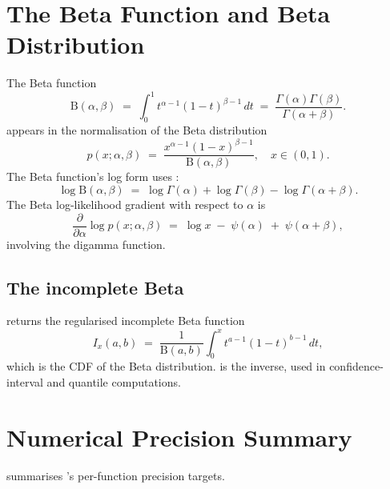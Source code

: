\section{The Beta Function and Beta Distribution}
\label{sec:special_functions:beta_function}

The Beta function
\[
\mathrm{B}(\alpha, \beta) \;=\; \int_0^1 t^{\alpha - 1} (1 - t)^{\beta - 1}\, dt
\;=\; \frac{\Gamma(\alpha) \Gamma(\beta)}{\Gamma(\alpha + \beta)}.
\]
appears in the normalisation of the Beta distribution
\[
p(x; \alpha, \beta) \;=\; \frac{x^{\alpha - 1} (1 - x)^{\beta - 1}}{\mathrm{B}(\alpha, \beta)},
\quad x \in (0, 1).
\]
The Beta function's log form uses :
\[
\log \mathrm{B}(\alpha, \beta) \;=\; \log\Gamma(\alpha) + \log\Gamma(\beta) - \log\Gamma(\alpha + \beta).
\]
The Beta log-likelihood gradient with respect to $\alpha$ is
\[
\frac{\partial}{\partial \alpha} \log p(x; \alpha, \beta)
\;=\; \log x \;-\; \psi(\alpha) \;+\; \psi(\alpha + \beta),
\]
involving the digamma function.

\subsection{The incomplete Beta}
\label{ssec:special_functions:betainc}

 returns the regularised incomplete Beta
function
\[
I_x(a, b) \;=\; \frac{1}{\mathrm{B}(a, b)} \int_0^x t^{a-1} (1-t)^{b-1}\, dt,
\]
which is the CDF of the Beta distribution.  is
the inverse, used in confidence-interval and quantile
computations.

\section{Numerical Precision Summary}
\label{sec:special_functions:precision_summary}

 summarises
\Lucid's per-function precision targets.

